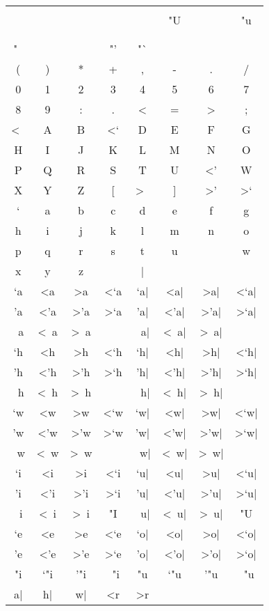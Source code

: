 \documentclass{article}
\begin{document}
\begin{tabular}{cccccccc}
   &     &     &     &     &      &      &     \\
   &     &     &     &     & "U   &      & "u  \\
   &     &     &     &     &      &      &     \\
   &     &     &     &     &      &      &     \\
"~ &     &     & "'  & "`  &      &      &     \\
(  & )   & *   & +   & ,   & -    & .    & /   \\
0  & 1   & 2   & 3   & 4   & 5    & 6    & 7   \\
8  & 9   & :   & .   & <   & =    & >    & ;   \\
<~ & A   & B   & <`  & D   & E    & F    & G   \\
H  & I   & J   & K   & L   & M    & N    & O   \\
P  & Q   & R   & S   & T   & U    &  <'  & W   \\
X  & Y   & Z   & [   & >~  & ]    &  >'  & >`  \\
`  & a   & b   & c   & d   & e    &  f   & g   \\
h  & i   & j   & k   & l   & m    &  n   & o   \\
p  & q   & r   & s   & t   & u    &      & w   \\
x  & y   & z   &     & |   &      & ~    &     \\
`a & <a  & >a  & <`a & `a| & <a|  & >a|  & <`a| \\
'a & <'a & >'a & >`a & 'a| & <'a| & >'a| & >`a| \\
~a & <~a & >~a &     & ~a| & <~a| & >~a| &      \\
`h & <h  & >h  & <`h & `h| & <h|  & >h|  & <`h| \\
'h & <'h & >'h & >`h & 'h| & <'h| & >'h| & >`h| \\
~h & <~h & >~h &     & ~h| & <~h| & >~h| &      \\
`w & <w  & >w  & <`w & `w| & <w|  & >w|  & <`w| \\
'w & <'w & >'w & >`w & 'w| & <'w| & >'w| & >`w| \\
~w & <~w & >~w &     & ~w| & <~w| & >~w| &      \\
`i & <i  & >i  & <`i & `u| & <u|  & >u|  & <`u| \\
'i & <'i & >'i & >`i & 'u| & <'u| & >'u| & >`u| \\
~i & <~i & >~i & "I  & ~u| & <~u| & >~u| & "U   \\
`e & <e  & >e  & <`e & `o| & <o|  & >o|  & <`o| \\
'e & <'e & >'e & >`e & 'o| & <'o| & >'o| & >`o| \\
"i & `"i & '"i & ~"i & "u  & `"u  & '"u  & ~"u \\
a| & h|  & w| & <r & >r \\
\end{tabular}
\end{document}
